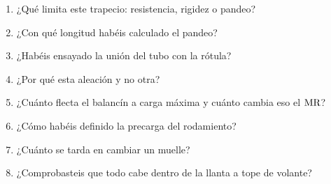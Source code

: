 \begin{juez}
\begin{enumerate}
  \item ¿Qué limita este trapecio: resistencia, rigidez o pandeo?
  \item ¿Con qué longitud habéis calculado el pandeo?
  \item ¿Habéis ensayado la unión del tubo con la rótula?
  \item ¿Por qué esta aleación y no otra?
  \item ¿Cuánto flecta el balancín a carga máxima y cuánto cambia eso el $\mathrm{MR}$?
  \item ¿Cómo habéis definido la precarga del rodamiento?
  \item ¿Cuánto se tarda en cambiar un muelle?
  \item ¿Comprobasteis que todo cabe dentro de la llanta a tope de volante?
\end{enumerate}
\end{juez}
